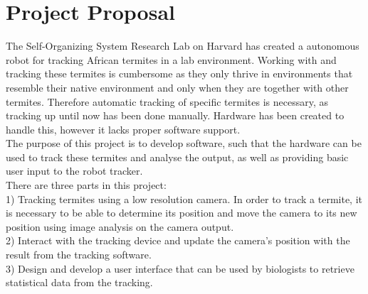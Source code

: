 
\section{Project Proposal}

The Self-Organizing System Research Lab on Harvard has created a autonomous robot for tracking African termites in a lab environment. Working with and tracking these termites is cumbersome as they only thrive in environments that resemble their native environment and only when they are together with other termites. Therefore automatic tracking of specific termites is necessary, as tracking up until now has been done manually. Hardware has been created to handle this, however it lacks proper software support. \\

The purpose of this project is to develop software, such that the hardware can be used to track these termites and analyse the output, as well as providing basic user input to the robot tracker. \\

There are three parts in this project: \\ 

1) Tracking termites using a low resolution camera. In order to track a termite, it is necessary to be able to determine its position and move the camera to its new position using image analysis on the camera output. \\

2) Interact with the tracking device and update the camera's position with the result from the tracking software. \\

3) Design and develop a user interface that can be used by biologists to retrieve statistical data from the tracking. \\ 